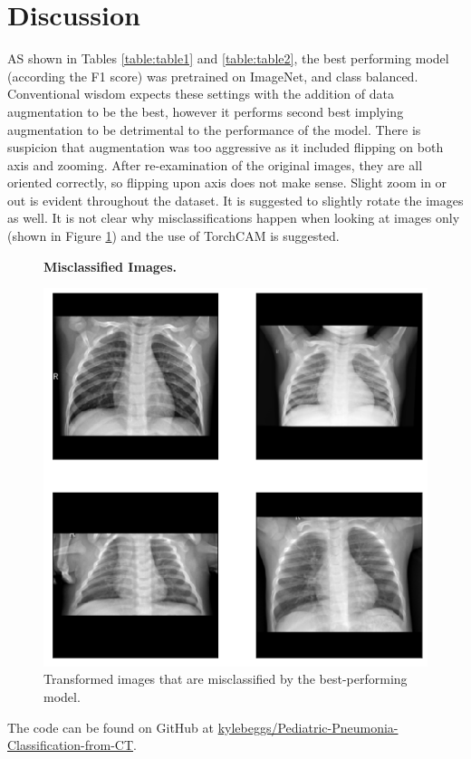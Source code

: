 \documentclass[10pt,twocolumn,letterpaper]{article}
\begin{document}
\section{Discussion}

AS shown in Tables \ref{table:table1} and \ref{table:table2}, the best performing model (according the F1 score) was pretrained on ImageNet, and class balanced. Conventional wisdom expects these settings with the addition of data augmentation to be the best, however it performs second best implying augmentation to be detrimental to the performance of the model. There is suspicion that augmentation was too aggressive as it included flipping on both axis and zooming. After re-examination of the original images, they are all oriented correctly, so flipping upon axis does not make sense. Slight zoom in or out is evident throughout the dataset. It is suggested to slightly rotate the images as well. It is not clear why misclassifications happen when looking at images only (shown in Figure \ref{fig:fig6}) and the use of TorchCAM is suggested.

\begin{figure}[h]
   \begin{center}
      \textbf{Misclassified Images.}\par\medskip
      \includegraphics[width=0.95\linewidth]{images/misclassfied.png}
   \end{center}
   \caption{Transformed images that are misclassified by the best-performing model.}
\label{fig:fig6}
\end{figure}

The code can be found on GitHub at \href{https://github.com/kylebeggs/Pediatric-Pneumonia-Classification-from-CT.}{kylebeggs/Pediatric-Pneumonia-Classification-from-CT}.
\end{document}
